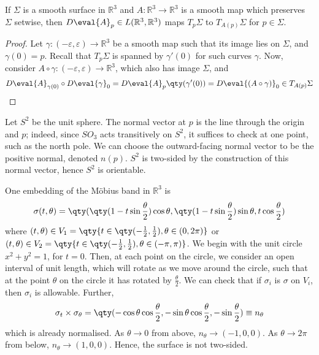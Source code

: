 \begin{lemma}
	If $\Sigma$ is a smooth surface in $\mathbb R^3$ and $A \colon \mathbb R^3 \to \mathbb R^3$ is a smooth map which preserves $\Sigma$ setwise, then $D\eval{A}_p \in L(\mathbb R^3, \mathbb R^3)$ maps $T_p \Sigma$ to $T_{A(p)} \Sigma$ for $p \in \Sigma$.
\end{lemma}
\begin{proof}
	Let $\gamma \colon (-\varepsilon, \varepsilon) \to \mathbb R^3$ be a smooth map such that its image lies on $\Sigma$, and $\gamma(0) = p$.
	Recall that $T_p \Sigma$ is spanned by $\gamma'(0)$ for such curves $\gamma$.
	Now, consider $A \circ \gamma \colon (-\varepsilon, \varepsilon) \to \mathbb R^3$, which also has image $\Sigma$, and
	\begin{align*}
		D \eval{A}_{\gamma(0)} \circ D \eval{\gamma}_0 = D \eval{A}_p \qty(\gamma'(0)) = D \eval{(A \circ \gamma)}_0 \in T_{A(p)} \Sigma
	\end{align*}
\end{proof}
\begin{example}
	Let $S^2$ be the unit sphere.
	The normal vector at $p$ is the line through the origin and $p$; indeed, since $SO_3$ acts transitively on $S^2$, it suffices to check at one point, such as the north pole.
	We can choose the outward-facing normal vector to be the positive normal, denoted $n(p)$.
	$S^2$ is two-sided by the construction of this normal vector, hence $S^2$ is orientable.
\end{example}
\begin{example}
	One embedding of the M\"obius band in $\mathbb R^3$ is
	\begin{align*}
		\sigma(t,\theta) = \qty(\qty(1 - t \sin \frac{\theta}{2})\cos \theta, \qty(1 - t \sin \frac{\theta}{2})\sin \theta, t \cos \frac{\theta}{2})
	\end{align*}
	where $(t,\theta) \in V_1 = \qty{t \in \qty(-\frac{1}{2}, \frac{1}{2}), \theta \in (0,2\pi)}$ or $(t,\theta) \in V_2 = \qty{t \in \qty(-\frac{1}{2}, \frac{1}{2}), \theta \in (-\pi, \pi)}$.
	We begin with the unit circle $x^2 + y^2 = 1$, for $t = 0$.
	Then, at each point on the circle, we consider an open interval of unit length, which will rotate as we move around the circle, such that at the point $\theta$ on the circle it has rotated by $\frac{\theta}{2}$.
	We can check that if $\sigma_i$ is $\sigma$ on $V_i$, then $\sigma_i$ is allowable.
	Further,
	\begin{align*}
		\sigma_t \times \sigma_\theta = \qty(-\cos\theta \cos\frac{\theta}{2}, -\sin\theta \cos\frac{\theta}{2}, -\sin\frac{\theta}{2}) \equiv n_\theta
	\end{align*}
	which is already normalised.
	As $\theta \to 0$ from above, $n_\theta \to (-1,0,0)$.
	As $\theta \to 2\pi$ from below, $n_\theta \to (1,0,0)$.
	Hence, the surface is not two-sided.
\end{example}
